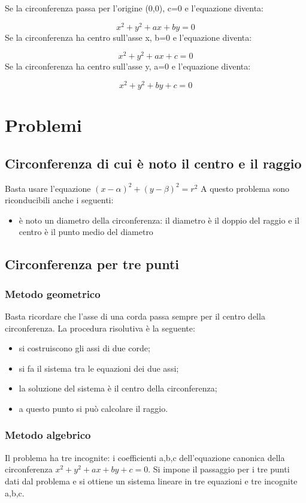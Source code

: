 \documentclass[10pt,a4paper]{article}
\begin{document}
Se la circonferenza passa per l'origine (0,0), c=0 e l'equazione diventa:

$$ x^{2}+y^{2}+ax+by=0 $$
Se la circonferenza ha centro sull'asse x, b=0 e l'equazione diventa:

$$ x^{2}+y^{2}+ax+c=0 $$
Se la circonferenza ha centro sull'asse y, a=0 e l'equazione diventa:

$$ x^{2}+y^{2}+by+c=0 $$

\section{Problemi}

\subsection{Circonferenza di cui è noto il centro e il raggio}
Basta usare l'equazione $ (x-\alpha )^{2}+(y-\beta )^{2}=r^{2} $
 A questo problema sono riconducibili anche i seguenti:
	\begin{itemize}
		\item è noto un diametro della circonferenza: il diametro è il doppio del raggio e il centro è il punto medio del diametro
	\end{itemize}

\subsection{Circonferenza per tre punti}
	\subsubsection{Metodo geometrico}
Basta ricordare che l'asse di una corda passa sempre per il centro della circonferenza. La procedura risolutiva è la seguente:
\begin{itemize}
	\item si costruiscono gli assi di due corde;
	\item si fa il sistema tra le equazioni dei due assi;
	\item la soluzione del sistema è il centro della circonferenza;
	\item a questo punto si può calcolare il raggio.
\end{itemize}

	\subsubsection{Metodo algebrico}
Il problema ha tre incognite: i coefficienti a,b,c dell'equazione canonica della circonferenza $ x^{2}+y^{2}+ax+by+c=0$. Si impone il passaggio per i tre punti dati dal problema e si ottiene un sistema lineare in tre equazioni e tre incognite a,b,c.	
\end{document}
